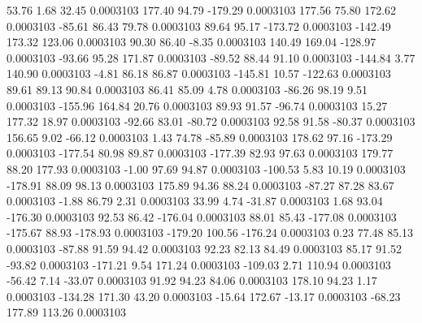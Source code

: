        53.76        1.68       32.45     0.0003103
      177.40       94.79     -179.29     0.0003103
      177.56       75.80      172.62     0.0003103
      -85.61       86.43       79.78     0.0003103
       89.64       95.17     -173.72     0.0003103
     -142.49      173.32      123.06     0.0003103
       90.30       86.40       -8.35     0.0003103
      140.49      169.04     -128.97     0.0003103
      -93.66       95.28      171.87     0.0003103
      -89.52       88.44       91.10     0.0003103
     -144.84        3.77      140.90     0.0003103
       -4.81       86.18       86.87     0.0003103
     -145.81       10.57     -122.63     0.0003103
       89.61       89.13       90.84     0.0003103
       86.41       85.09        4.78     0.0003103
      -86.26       98.19        9.51     0.0003103
     -155.96      164.84       20.76     0.0003103
       89.93       91.57      -96.74     0.0003103
       15.27      177.32       18.97     0.0003103
      -92.66       83.01      -80.72     0.0003103
       92.58       91.58      -80.37     0.0003103
      156.65        9.02      -66.12     0.0003103
        1.43       74.78      -85.89     0.0003103
      178.62       97.16     -173.29     0.0003103
     -177.54       80.98       89.87     0.0003103
     -177.39       82.93       97.63     0.0003103
      179.77       88.20      177.93     0.0003103
       -1.00       97.69       94.87     0.0003103
     -100.53        5.83       10.19     0.0003103
     -178.91       88.09       98.13     0.0003103
      175.89       94.36       88.24     0.0003103
      -87.27       87.28       83.67     0.0003103
       -1.88       86.79        2.31     0.0003103
       33.99        4.74      -31.87     0.0003103
        1.68       93.04     -176.30     0.0003103
       92.53       86.42     -176.04     0.0003103
       88.01       85.43     -177.08     0.0003103
     -175.67       88.93     -178.93     0.0003103
     -179.20      100.56     -176.24     0.0003103
        0.23       77.48       85.13     0.0003103
      -87.88       91.59       94.42     0.0003103
       92.23       82.13       84.49     0.0003103
       85.17       91.52      -93.82     0.0003103
     -171.21        9.54      171.24     0.0003103
     -109.03        2.71      110.94     0.0003103
      -56.42        7.14      -33.07     0.0003103
       91.92       94.23       84.06     0.0003103
      178.10       94.23        1.17     0.0003103
     -134.28      171.30       43.20     0.0003103
      -15.64      172.67      -13.17     0.0003103
      -68.23      177.89      113.26     0.0003103
